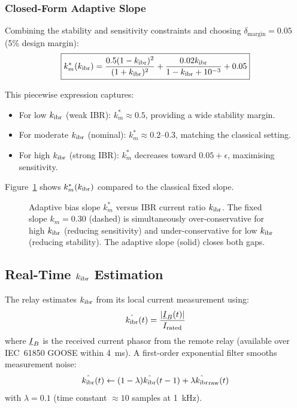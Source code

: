 \subsubsection{Closed-Form Adaptive Slope}

Combining the stability and sensitivity constraints and choosing
$\delta_\mathrm{margin} = 0.05$ (5\% design margin):
\begin{equation}
  \boxed{k_m^\ast(k_{\mathrm{ibr}}) = \frac{0.5(1 - k_{\mathrm{ibr}})^2}{(1 + k_{\mathrm{ibr}})^2}
    + \frac{0.02k_{\mathrm{ibr}}}{1 - k_{\mathrm{ibr}} + 10^{-3}} + 0.05}
  \label{eq:ch4_km_formula}
\end{equation}

This piecewise expression captures:
\begin{itemize}
\item For low $k_{\mathrm{ibr}}$ (weak IBR): $k_m^\ast \approx 0.5$, providing
      a wide stability margin.
\item For moderate $k_{\mathrm{ibr}}$ (nominal): $k_m^\ast \approx 0.2$--$0.3$,
      matching the classical setting.
\item For high $k_{\mathrm{ibr}}$ (strong IBR): $k_m^\ast$ decreases toward
      $0.05 + \epsilon$, maximising sensitivity.
\end{itemize}

Figure~\ref{fig:ch4_adaptive_slope} shows $k_m^\ast(k_{\mathrm{ibr}})$ compared to
the classical fixed slope.

\begin{figure}[htbp]
  \centering
  
  \caption{Adaptive bias slope $k_m^\ast$ versus IBR current ratio $k_{\mathrm{ibr}}$.
           The fixed slope $k_m = 0.30$ (dashed) is simultaneously
           over-conservative for high $k_{\mathrm{ibr}}$ (reducing sensitivity) and
           under-conservative for low $k_{\mathrm{ibr}}$ (reducing stability).
           The adaptive slope (solid) closes both gaps.}
  \label{fig:ch4_adaptive_slope}
\end{figure}

\subsection{Real-Time \texorpdfstring{$k_{\mathrm{ibr}}$}{k\_ibr} Estimation}

The relay estimates $k_{\mathrm{ibr}}$ from its local current measurement using:
\begin{equation}
  \hat{k_{\mathrm{ibr}}}(t) = \frac{|\underline{I}_B(t)|}{I_\mathrm{rated}}
  \label{eq:ch4_kibr_est}
\end{equation}
where $\underline{I}_B$ is the received current phasor from the remote relay
(available over IEC~61850 GOOSE within 4~ms). A first-order exponential
filter smooths measurement noise:
\begin{equation}
  \hat{k_{\mathrm{ibr}}}(t) \leftarrow (1-\lambda)\hat{k_{\mathrm{ibr}}}(t-1) + \lambda\hat{k_{\mathrm{ibr}}}_\mathrm{raw}(t)
  \label{eq:ch4_kibr_filter}
\end{equation}
with $\lambda = 0.1$ (time constant $\approx 10$ samples at 1~kHz).

